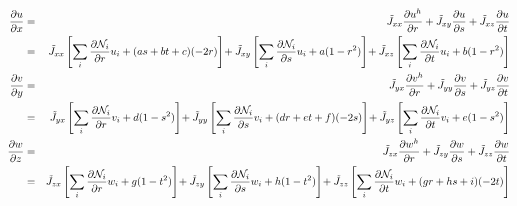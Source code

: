 \begin{eqnarray}
\frac{\partial u}{\partial x} 
&=& \tilde{J}_{xx} \frac{\partial u^h}{\partial r} 
+\tilde{J}_{xy} \frac{\partial u}{\partial s}
+\tilde{J}_{xz} \frac{\partial u}{\partial t} \nn\\
&=&  \tilde{J}_{xx} \left[\sum_i \frac{\partial \bN_i}{\partial r} u_i + (a s + b t +c)(-2r)  \right]\! %
+\tilde{J}_{xy} \left[\sum_i \frac{\partial \bN_i}{\partial s} u_i + a (1-r^2)  \right]\! %
+\tilde{J}_{xz} \left[\sum_i \frac{\partial \bN_i}{\partial t} u_i + b (1-r^2)  \right]
\nn\\
\frac{\partial v}{\partial y} 
&=& \tilde{J}_{yx} \frac{\partial v^h}{\partial r} 
+\tilde{J}_{yy} \frac{\partial v}{\partial s}
+\tilde{J}_{yz} \frac{\partial v}{\partial t} \nn\\
&=&  \tilde{J}_{yx} \left[\sum_i \frac{\partial \bN_i}{\partial r} v_i + d (1-s^2)  \right]\!
+\tilde{J}_{yy} \left[\sum_i \frac{\partial \bN_i}{\partial s} v_i + (d r + e t +f)(-2s) \right]\!
+\tilde{J}_{yz} \left[\sum_i \frac{\partial \bN_i}{\partial t} v_i + e (1-s^2)  \right] 
\nn\\
\frac{\partial w}{\partial z} 
&=& \tilde{J}_{zx} \frac{\partial w^h}{\partial r} 
+\tilde{J}_{zy} \frac{\partial w}{\partial s}
+\tilde{J}_{zz} \frac{\partial w}{\partial t} \nn\\
&=&  \tilde{J}_{zx} \left[\sum_i \frac{\partial \bN_i}{\partial r} w_i + g (1-t^2)  \right]\! 
+\tilde{J}_{zy} \left[\sum_i \frac{\partial \bN_i}{\partial s} w_i + h (1-t^2) \right] \! 
+\tilde{J}_{zz} \left[\sum_i \frac{\partial \bN_i}{\partial t} w_i + (g r + h s +i)(-2t)  \right] \nn
\end{eqnarray}

